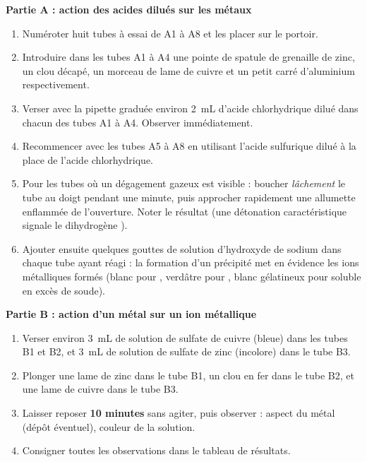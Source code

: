 \documentclass[11pt]{article}
\newcommand{\cle}[1]{{\popxbold\color{popdark}#1}}
\newcounter{popsec}
\newcounter{popsub}
\newcommand{\courssub}[1]{%
  \stepcounter{popsub}%
  \par\vspace{9pt}\noindent{\popxbold\fontsize{11.5}{13}\selectfont\color{popink}{\color{poporange}\thepopsec.\thepopsub}\hspace{6pt}#1}\par\nopagebreak\vspace{4pt}
}
\begin{document}
\courssub{Protocole}

\textbf{Partie A : action des acides dilués sur les métaux}\par

\begin{enumerate}
\item Numéroter huit tubes à essai de A1 à A8 et les placer sur le portoir.
\item Introduire dans les tubes A1 à A4 une pointe de spatule de grenaille de zinc, un clou décapé, un morceau de lame de cuivre et un petit carré d'aluminium respectivement.
\item Verser avec la pipette graduée environ \SI{2}{mL} d'acide chlorhydrique dilué dans chacun des tubes A1 à A4. Observer immédiatement.
\item Recommencer avec les tubes A5 à A8 en utilisant l'acide sulfurique dilué à la place de l'acide chlorhydrique.
\item Pour les tubes où un dégagement gazeux est visible : boucher \emph{lâchement} le tube au doigt pendant une minute, puis approcher rapidement une allumette enflammée de l'ouverture. Noter le résultat (une \cle{détonation} caractéristique signale le dihydrogène ).
\item Ajouter ensuite quelques gouttes de solution d'hydroxyde de sodium dans chaque tube ayant réagi : la formation d'un \cle{précipité} met en évidence les ions métalliques formés (blanc pour , verdâtre pour , blanc gélatineux pour  soluble en excès de soude).
\end{enumerate}

\textbf{Partie B : action d'un métal sur un ion métallique}\par

\begin{enumerate}
\item Verser environ \SI{3}{mL} de solution de sulfate de cuivre (bleue) dans les tubes B1 et B2, et \SI{3}{mL} de solution de sulfate de zinc (incolore) dans le tube B3.
\item Plonger une lame de zinc dans le tube B1, un clou en fer dans le tube B2, et une lame de cuivre dans le tube B3.
\item Laisser reposer \textbf{10 minutes} sans agiter, puis observer : aspect du métal (dépôt éventuel), couleur de la solution.
\item Consigner toutes les observations dans le tableau de résultats.
\end{enumerate}
\end{document}

